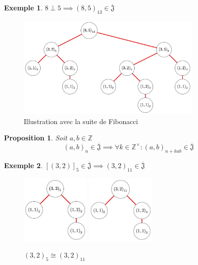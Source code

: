\documentclass{article}
\newtheorem{proposition}{Proposition}
\newtheorem{example}{Exemple}
\newcommand{\J}{\mathfrak{J}}
\newcommand{\JS}{\overline{\J}}
\begin{document}
\begin{example}
    $8 \perp 5 \implies {(8, 5)}_{13} \in \JS$
\end{example}
\begin{figure}[h]
    \caption{Illustration avec la suite de Fibonacci}
    \centering
    \includegraphics[width=0.8\textwidth]{fibo}
\end{figure}

\begin{proposition}
    Soit $a, b \in \mathbb{Z}$
    \[ {(a, b)}_n \in \JS \implies \forall k \in \mathbb{Z}^\times : {(a, b)}_{n+kab} \in \JS \]
\end{proposition}

\begin{example}
    ${[(3, 2)]}_5 \in \JS \implies {(3, 2)}_{11} \in \JS$
\end{example}

\begin{figure}[h]
    \caption{${(3, 2)}_5 \cong {(3, 2)}_{11}$}
    \centering
    \includegraphics[width=0.3\textwidth]{532}
    \includegraphics[width=0.3\textwidth]{11_3_2}
\end{figure}
\end{document}
